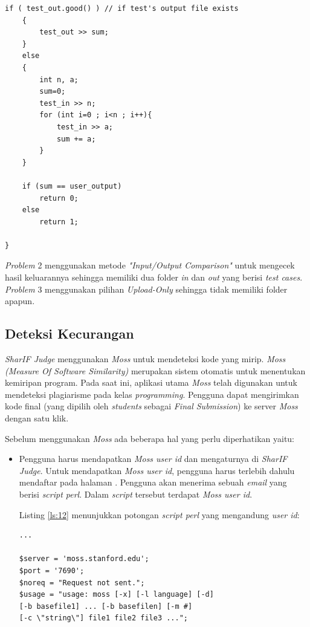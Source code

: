 \documentclass[a4paper,twoside]{article}
\begin{document}
\begin{enumerate}
\begin{lstlisting}[basicstyle=\ttfamily, frame=single,
		columns=fullflexible, keepspaces=true, breaklines=true, label=ls:11, caption=Isi \textit{File tester.cpp} untuk \textit{Problem} 1]
	if ( test_out.good() ) // if test's output file exists
	{
		test_out >> sum;
	}
	else
	{
		int n, a;
		sum=0;
		test_in >> n;
		for (int i=0 ; i<n ; i++){
			test_in >> a;
			sum += a;
		}
	}

	if (sum == user_output)
		return 0;
	else
		return 1;

}
		\end{lstlisting}
		
		\textit{Problem} 2 menggunakan metode \textit{"Input/Output Comparison"} untuk mengecek hasil keluarannya sehingga memiliki dua folder \textit{in} dan \textit{out} yang berisi \textit{test cases}. \textit{Problem} 3 menggunakan pilihan \textit{Upload-Only} sehingga tidak memiliki folder apapun.
		
		\subsection*{Deteksi Kecurangan}
		\label{subsec:deteksi_kecurangan}
		\textit{SharIF Judge} menggunakan \textit{Moss} untuk mendeteksi kode yang mirip. \textit{Moss (Measure Of Software Similarity)} merupakan sistem otomatis untuk menentukan kemiripan program. Pada saat ini, aplikasi utama \textit{Moss} telah digunakan untuk mendeteksi plagiarisme pada kelas \textit{programming}. Pengguna dapat mengirimkan kode final (yang dipilih oleh \textit{students} sebagai \textit{Final Submission}) ke server \textit{Moss} dengan satu klik.
		
		Sebelum menggunakan \textit{Moss} ada beberapa hal yang perlu diperhatikan yaitu:
		
		\begin{itemize}
			\item Pengguna harus mendapatkan \textit{Moss user id} dan mengaturnya di \textit{SharIF Judge}. Untuk mendapatkan \textit{Moss user id}, pengguna harus terlebih dahulu mendaftar pada halaman . Pengguna akan menerima sebuah \textit{email} yang berisi \textit{script perl}. Dalam \textit{script} tersebut terdapat \textit{Moss user id}.
			
			Listing \ref{ls:12} menunjukkan potongan \textit{script perl} yang mengandung \textit{user id}:
			\begin{lstlisting}[basicstyle=\ttfamily, frame=single,
			columns=fullflexible, keepspaces=true, breaklines=true, label=ls:12, caption=Potongan \textit{script perl}]
...

$server = 'moss.stanford.edu';
$port = '7690';
$noreq = "Request not sent.";
$usage = "usage: moss [-x] [-l language] [-d] 
[-b basefile1] ... [-b basefilen] [-m #] 
[-c \"string\"] file1 file2 file3 ...";


\end{lstlisting}
\end{itemize}
\end{enumerate}
\end{document}
